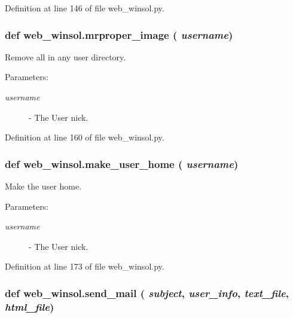 Definition at line 146 of file web\_\-winsol.py.\hypertarget{namespaceweb__winsol_0156c53f75f815966c2bff40b2de7ff6}{
\subsubsection[mrproper\_\-image]{\setlength{\rightskip}{0pt plus 5cm}def web\_\-winsol.mrproper\_\-image ( {\em username})}}
\label{namespaceweb__winsol_0156c53f75f815966c2bff40b2de7ff6}


Remove all in any user directory. 

\begin{Desc}
\item[Parameters:]
\begin{description}
\item[{\em username}]- The User nick. \end{description}
\end{Desc}


Definition at line 160 of file web\_\-winsol.py.\hypertarget{namespaceweb__winsol_2913e719d536aeaaf2cf8314393b008c}{
\subsubsection[make\_\-user\_\-home]{\setlength{\rightskip}{0pt plus 5cm}def web\_\-winsol.make\_\-user\_\-home ( {\em username})}}
\label{namespaceweb__winsol_2913e719d536aeaaf2cf8314393b008c}


Make the user home. 

\begin{Desc}
\item[Parameters:]
\begin{description}
\item[{\em username}]- The User nick. \end{description}
\end{Desc}


Definition at line 173 of file web\_\-winsol.py.\hypertarget{namespaceweb__winsol_76afedd334ceb5eafc031bf8013780ca}{
\subsubsection[send\_\-mail]{\setlength{\rightskip}{0pt plus 5cm}def web\_\-winsol.send\_\-mail ( {\em subject},  {\em user\_\-info},  {\em text\_\-file},  {\em html\_\-file})}}
\label{namespaceweb__winsol_76afedd334ceb5eafc031bf8013780ca}


